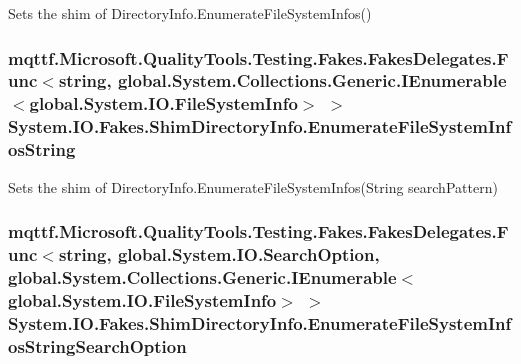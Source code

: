 Sets the shim of Directory\-Info.\-Enumerate\-File\-System\-Infos()

\hypertarget{class_system_1_1_i_o_1_1_fakes_1_1_shim_directory_info_a095c429ab8c8b32c1be6296702a5ed7e}{
\subsubsection[{Enumerate\-File\-System\-Infos\-String}]{\setlength{\rightskip}{0pt plus 5cm}mqttf.\-Microsoft.\-Quality\-Tools.\-Testing.\-Fakes.\-Fakes\-Delegates.\-Func$<$string, global.\-System.\-Collections.\-Generic.\-I\-Enumerable$<$global.\-System.\-I\-O.\-File\-System\-Info$>$ $>$ System.\-I\-O.\-Fakes.\-Shim\-Directory\-Info.\-Enumerate\-File\-System\-Infos\-String\hspace{0.3cm}{\ttfamily [set]}}}\label{class_system_1_1_i_o_1_1_fakes_1_1_shim_directory_info_a095c429ab8c8b32c1be6296702a5ed7e}


Sets the shim of Directory\-Info.\-Enumerate\-File\-System\-Infos(\-String search\-Pattern)

\hypertarget{class_system_1_1_i_o_1_1_fakes_1_1_shim_directory_info_ab676875f6f12050d469cdeb650141f13}{
\subsubsection[{Enumerate\-File\-System\-Infos\-String\-Search\-Option}]{\setlength{\rightskip}{0pt plus 5cm}mqttf.\-Microsoft.\-Quality\-Tools.\-Testing.\-Fakes.\-Fakes\-Delegates.\-Func$<$string, global.\-System.\-I\-O.\-Search\-Option, global.\-System.\-Collections.\-Generic.\-I\-Enumerable$<$global.\-System.\-I\-O.\-File\-System\-Info$>$ $>$ System.\-I\-O.\-Fakes.\-Shim\-Directory\-Info.\-Enumerate\-File\-System\-Infos\-String\-Search\-Option\hspace{0.3cm}{\ttfamily [set]}}}\label{class_system_1_1_i_o_1_1_fakes_1_1_shim_directory_info_ab676875f6f12050d469cdeb650141f13}


